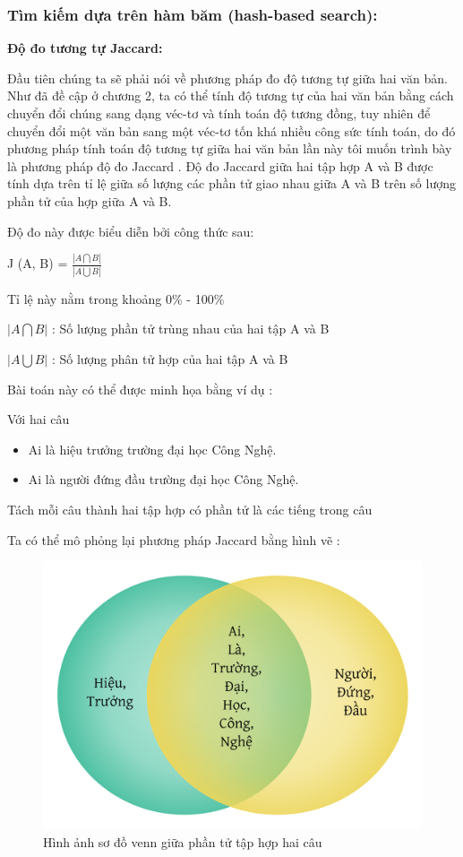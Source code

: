 \documentclass[12pt]{report}
\begin{document}
\subsubsection{Tìm kiếm dựa trên hàm băm (hash-based search):}

\textbf{Độ đo tương tự Jaccard:}

Đầu tiên chúng ta sẽ phải nói về phương pháp đo độ tương tự giữa hai văn bản. Như đã đề cập ở chương 2, ta có thể tính độ tương tự của hai văn bản bằng cách chuyển đổi chúng sang dạng véc-tơ và tính toán độ tương đồng, tuy nhiên để chuyển đổi một văn bản sang một véc-tơ tốn khá nhiều công sức tính toán, do đó phương pháp tính toán độ tương tự giữa hai văn bản lần này tôi muốn trình bày là phương pháp độ đo Jaccard \cite{cia-jaccard}. Độ đo Jaccard giữa hai tập hợp A và B được tính dựa trên tỉ lệ giữa số lượng các phần tử giao nhau giữa A và B trên số lượng phần tử của hợp giữa A và B.

Độ đo này được biểu diễn bởi công thức sau:

\begin{center}
	J (A, B) = $\frac{|A \bigcap B|}{| A \bigcup B|}$

	Tỉ lệ này nằm trong khoảng 0\% - 100\%

	$|A \bigcap B|$ : Số lượng phần tử trùng nhau của hai tập A và B
	
	$|A \bigcup B|$ : Số lượng phân tử hợp của hai tập A và B 

\end{center}

Bài toán này có thể được minh họa bằng ví dụ :

Với hai câu
\begin{itemize}
	\item Ai là hiệu trưởng trường đại học Công Nghệ.
	\item Ai là người đứng đầu trường đại học Công Nghệ. 
\end{itemize}

Tách mỗi câu thành hai tập hợp có phần tử là các tiếng trong câu

Ta có thể mô phỏng lại phương pháp Jaccard \cite{cia-jaccard} bằng hình vẽ :

\begin{figure}[h]
	\centering
	\includegraphics[scale=0.3]{jaccard_exp}
	\caption{Hình ảnh sơ đồ venn giữa phần tử tập hợp hai câu}
\end{figure}
\end{document}

